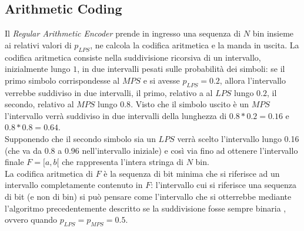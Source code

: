 \subsection{Arithmetic Coding}
Il \emph{Regular Arithmetic Encoder} prende in ingresso una sequenza di $N$ bin
insieme ai relativi valori di $p_{LPS}$, ne calcola la codifica aritmetica e la 
manda in uscita. La codifica aritmetica consiste nella suddivisione ricorsiva
di un intervallo, inizialmente lungo $1$, in due intervalli pesati sulle 
probabilità dei simboli: se il primo simbolo corrispondesse al $MPS$ e si 
avesse $p_{LPS}=0.2$, allora l'intervallo verrebbe suddiviso in due intervalli,
il primo, relativo a al $LPS$ lungo $0.2$, il secondo, relativo al $MPS$ lungo
$0.8$. Visto che il simbolo uscito è un $MPS$ l'intervallo verrà suddiviso in
due intervalli della lunghezza di $0.8*0.2=0.16$ e $0.8*0.8= 0.64$. \\
Supponendo che il secondo simbolo sia un $LPS$ verrà scelto l'intervallo lungo
0.16 (che va da $0.8$ a $0.96$ nell'intervallo iniziale) e così via fino ad
ottenere l'intervallo finale $F={[a,b[}$ che rappresenta l'intera stringa di
$N$ bin. \\
La codifica aritmetica di $F$ è la sequenza di bit minima che si riferisce ad un
intervallo completamente contenuto in $F$: l'intervallo cui si riferisce una
sequenza di bit (e non di bin) si può pensare come l'intervallo che si
otterrebbe mediante l'algoritmo precedentemente descritto se la suddivisione
fosse sempre binaria , ovvero quando $p_{LPS} = p_{MPS} = 0.5$.
